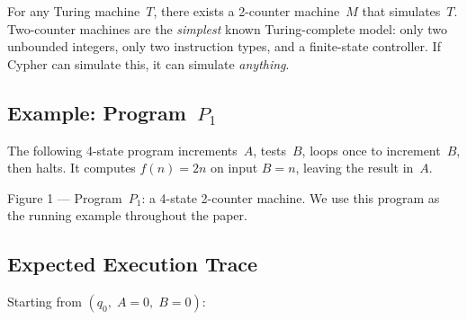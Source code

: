 \documentclass[11pt,a4paper]{article}
\begin{document}
\begin{factbox}
For any Turing machine~$T$, there exists a 2-counter machine~$M$ that
simulates~$T$. Two-counter machines are the \emph{simplest} known
Turing-complete model: only two unbounded integers, only two instruction
types, and a finite-state controller. If Cypher can simulate this, it
can simulate \emph{anything}.
\end{factbox}

\subsection{Example: Program~$P_1$}

The following 4-state program increments~$A$, tests~$B$, loops once to
increment~$B$, then halts. It computes $f(n) = 2n$ on input $B = n$,
leaving the result in~$A$.

\begin{center}
\end{center}
\begin{center}
\small\color{neo-muted}
Figure 1 --- Program~$P_1$: a 4-state 2-counter machine. We use this
program as the running example throughout the paper.
\end{center}

\subsection{Expected Execution Trace}

Starting from $(q_0,\; A{=}0,\; B{=}0)$:
\end{document}
